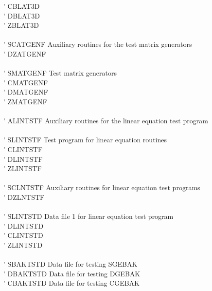 \begin{tabbing}
 \> \titem \' \> CBLAT3D \> \\
 \> \titem \' \> DBLAT3D \> \\
 \> \titem \' \> ZBLAT3D \> \\
\vspace{0.1ex} \\
 \> \titem \' \> SCATGENF\> Auxiliary routines for the test matrix generators \\
 \> \titem \' \> DZATGENF \> \\
\vspace{0.1ex} \\
 \> \titem \' \> SMATGENF\> Test matrix generators \\
 \> \titem \' \> CMATGENF \> \\
 \> \titem \' \> DMATGENF \> \\
 \> \titem \' \> ZMATGENF \> \\
\vspace{0.1ex} \\
 \> \titem \' \> ALINTSTF\> Auxiliary routines for the linear equation test program \\
\vspace{0.1ex} \\
 \> \titem \' \> SLINTSTF\> Test program for linear equation routines \\
 \> \titem \' \> CLINTSTF \> \\
 \> \titem \' \> DLINTSTF \> \\
 \> \titem \' \> ZLINTSTF \> \\
\vspace{0.1ex} \\
 \> \titem \' \> SCLNTSTF \> Auxiliary routines for linear equation test programs \\
 \> \titem \' \> DZLNTSTF \> \\
\vspace{0.1ex} \\
 \> \titem \' \> SLINTSTD\> Data file 1 for linear equation test program \\
 \> \titem \' \> DLINTSTD \> \\
 \> \titem \' \> CLINTSTD \> \\
 \> \titem \' \> ZLINTSTD \> \\
\vspace{0.1ex} \\
 \> \titem \' \> SBAKTSTD\> Data file for testing SGEBAK \\
 \> \titem \' \> DBAKTSTD \> Data file for testing DGEBAK \\
 \> \titem \' \> CBAKTSTD \> Data file for testing CGEBAK \\

\end{tabbing}
